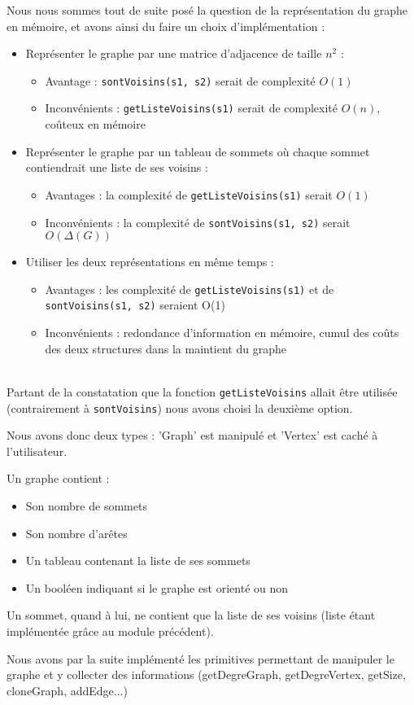 \documentclass[a4paper,10pt]{article}
\newcommand*{\itemb}{\item[$\bullet$]}
\begin{document}
Nous nous sommes tout de suite posé la question de la représentation du graphe en mémoire, et avons ainsi du faire un choix d'implémentation :
\begin{itemize}
	\itemb Représenter le graphe par une matrice d'adjacence de taille $n^2$ :
	\begin{itemize}
		\item Avantage : \texttt{sontVoisins(s1, s2)} serait de complexité $O(1)$
		\item Inconvénients : \texttt{getListeVoisins(s1)} serait de complexité $O(n)$, coûteux en mémoire
	\end{itemize}
\itemb Représenter le graphe par un tableau de sommets où chaque sommet contiendrait une liste de ses voisins :
	\begin{itemize}
		\item Avantages : la complexité de \texttt{getListeVoisins(s1)} serait $O(1)$
	\item Inconvénients : la complexité de \texttt{sontVoisins(s1, s2)} serait $O(\Delta(G))$
	\end{itemize}
\itemb Utiliser les deux représentations en même temps :
	\begin{itemize}
		\item Avantages : les complexité de \texttt{getListeVoisins(s1)} et de \texttt{sontVoisins(s1, s2)} seraient O(1)
		\item Inconvénients : redondance d'information en mémoire, cumul des coûts des deux structures dans la maintient du graphe
	\end{itemize}
\end{itemize}
~~\\
Partant de la constatation que la fonction \texttt{getListeVoisins} allait être utilisée (contrairement à \texttt{sontVoisins}) nous avons choisi la deuxième option.

Nous avons donc deux types : 'Graph' est manipulé et 'Vertex' est caché à l'utilisateur.

Un graphe contient :
\begin{itemize}
\itemb Son nombre de sommets
\itemb Son nombre d'arêtes
\itemb Un tableau contenant la liste de ses sommets
\itemb Un booléen indiquant si le graphe est orienté ou non
\end{itemize}

Un sommet, quand à lui, ne contient que la liste de ses voisins (liste étant implémentée grâce au module précédent).

Nous avons par la suite implémenté les primitives permettant de manipuler le graphe et y collecter des informations (getDegreGraph, getDegreVertex, getSize, cloneGraph, addEdge...)
\end{document}
